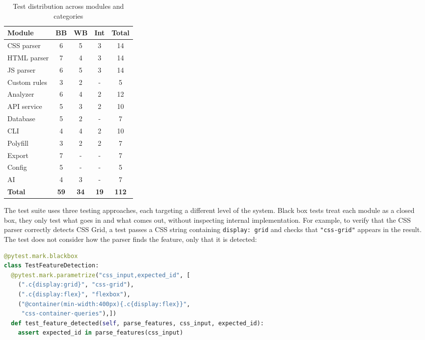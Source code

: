\begin{table}[H]
    \centering
    \begin{tabular}{|l|c|c|c|c|}
        \hline
        \textbf{Module} & \textbf{BB} & \textbf{WB} & \textbf{Int} & \textbf{Total} \\
        \hline \hline
        CSS parser    & 6 & 5 & 3 & 14 \\ \hline
        HTML parser   & 7 & 4 & 3 & 14 \\ \hline
        JS parser     & 6 & 5 & 3 & 14 \\ \hline
        Custom rules  & 3 & 2 & - & 5  \\ \hline
        Analyzer      & 6 & 4 & 2 & 12 \\ \hline
        API service   & 5 & 3 & 2 & 10 \\ \hline
        Database      & 5 & 2 & - & 7  \\ \hline
        CLI           & 4 & 4 & 2 & 10 \\ \hline
        Polyfill      & 3 & 2 & 2 & 7  \\ \hline
        Export        & 7 & - & - & 7  \\ \hline
        Config        & 5 & - & - & 5  \\ \hline
        AI            & 4 & 3 & - & 7  \\ \hline
        \textbf{Total} & \textbf{59} & \textbf{34} & \textbf{19} & \textbf{112} \\ \hline
    \end{tabular}
    \caption{Test distribution across modules and categories}
    \label{tab:test-distribution}
\end{table}

The test suite uses three testing approaches, each targeting a different level of the system.
Black box tests treat each module as a closed box, they only test what goes in and what comes out, without inspecting internal implementation. For example, to verify that the CSS parser correctly detects CSS Grid, a test passes a CSS string containing \texttt{display: grid} and checks that \texttt{"css-grid"} appears in the result. The test does not consider how the parser finds the feature, only that it is detected:

\begin{lstlisting}[caption={Black box test for feature detection}, label=src:blackbox-test, language=Python, basicstyle=\ttfamily\footnotesize, breaklines=true]
@pytest.mark.blackbox
class TestFeatureDetection:
  @pytest.mark.parametrize("css_input,expected_id", [
    (".c{display:grid}", "css-grid"),
    (".c{display:flex}", "flexbox"),
    ("@container(min-width:400px){.c{display:flex}}",
     "css-container-queries"),])
  def test_feature_detected(self, parse_features, css_input, expected_id):
    assert expected_id in parse_features(css_input)
\end{lstlisting}


